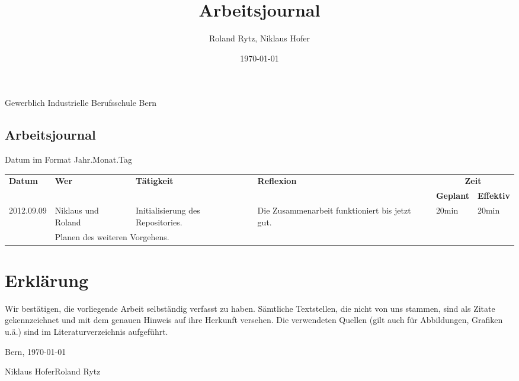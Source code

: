 \documentclass[11pt,paper=a4,final]{scrartcl}
\title{Arbeitsjournal}
\author{Roland Rytz, Niklaus Hofer}
\date{\today{}}
\let\stdsection\section
\renewcommand\section{\newpage\stdsection}
\begin{document}
\maketitle
\vfill
\begin{flushleft}
Gewerblich Industrielle Berufsschule Bern
\end{flushleft}
\newpage
\begin{landscape}
\section{Arbeitsjournal}
Datum im Format Jahr.Monat.Tag
\begin{longtable}{|p{1.8cm}|p{1.5cm}|p{7.5cm}|p{9.0cm}|l|l|}
\hline
\multirow{2}{*}{\bf Datum} & \multirow{2}{*}{\bf Wer} &\multirow{2}{*}{\bf T\"atigkeit} & \multirow{2}{*}{\bf Reflexion} & \multicolumn{2}{c|}{\bf Zeit} \\ \cline{5-6}
 & & & & \bf Geplant & \bf Effektiv \\ \hline
\hline
\endhead
2012.09.09 & Niklaus und Roland &
Initialisierung des Repositories. &
Die Zusammenarbeit funktioniert bis jetzt gut. &
20min & 20min \\ \hline \nopagebreak
\multicolumn{2}{|l|}{\bf Pendenzen} &\multicolumn{2}{p{16.5cm}|}{Planen des weiteren Vorgehens.}  & \multicolumn{2}{l|}{} \\ \hline
\end{longtable}
\end{landscape}
\newpage
%
\newpage
\section{Erkl\"arung}
Wir best\"atigen, die vorliegende Arbeit selbst\"andig verfasst zu haben. S\"amtliche Textstellen, die nicht von uns stammen, sind als Zitate gekennzeichnet und mit dem genauen Hinweis auf ihre Herkunft versehen. Die verwendeten Quellen (gilt auch f\"ur Abbildungen, Grafiken u.\"a.) sind im Literaturverzeichnis aufgef\"uhrt.

\vspace{4cm}
Bern, \today{}
\vspace{4cm}

Niklaus Hofer\hfill Roland Rytz\\
\vspace{2cm}
\hrulefill \hfill \hrulefill
\newpage
\end{document}
